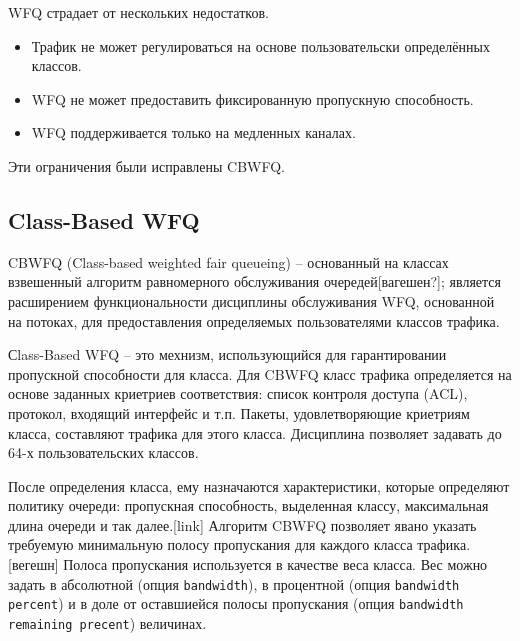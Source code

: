     WFQ страдает от нескольких недостатков.
    \begin{itemize}
        \item  Трафик не может регулироваться на основе пользовательски определённых классов.
        \item  WFQ не может предоставить фиксированную пропускную способность.
        \item  WFQ поддерживается только на медленных каналах.
    \end{itemize}

    Эти ограничения были исправлены CBWFQ.

    \subsection{Class-Based WFQ}


    CBWFQ (Class-based weighted fair queueing) -- основанный на классах взвешенный алгоритм равномерного обслуживания 
    очередей[вагешен?]; является расширением функциональности дисциплины обслуживания WFQ,
    основанной на потоках, для предоставления определяемых пользователями классов трафика. 

    Сlass-Based WFQ -- это мехнизм, использующийся для гарантировании пропускной способности
    для класса. Для CBWFQ класс трафика определяется на основе заданных криетриев
    соответствия: список контроля доступа (ACL), протокол, входящий интерфейс и т.п. Пакеты,
    удовлетворяющие криетриям класса, составляют трафика для этого класса. Дисциплина
    позволяет задавать до 64-х пользовательских классов.

    После определения класса, ему назначаются характеристики, которые определяют
    политику очереди: пропускная способность, выделенная классу, максимальная
    длина очереди и так далее.[link] Алгоритм CBWFQ позволяет явано указать требуемую минимальную
    полосу пропускания для каждого класса трафика.[вегешн] Полоса пропускания используется
    в качестве веса класса. Вес можно задать в абсолютной (опция \texttt{bandwidth}),
    в процентной (опция \texttt{bandwidth percent}) и в доле от оставшиейся
    полосы пропускания (опция \texttt{bandwidth remaining precent}) величинах.

